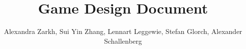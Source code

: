 \documentclass[]{article}
\title{Game Design Document}
\author{Alexandra Zarkh, Sui Yin Zhang, Lennart Leggewie, Stefan Glorch, Alexander Schallenberg}
\begin{document}
\maketitle

\begin{abstract}

\end{abstract}

\section{}
\end{document}
